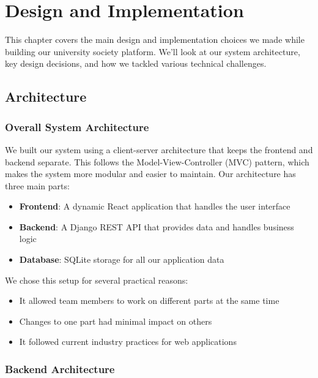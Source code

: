 \chapter{Design and Implementation}
\label{chap:design-and-implementation}

This chapter covers the main design and implementation choices we made while building our university society platform. We'll look at our system architecture, key design decisions, and how we tackled various technical challenges.

\section{Architecture}

\subsection{Overall System Architecture}

We built our system using a client-server architecture that keeps the frontend and backend separate. This follows the Model-View-Controller (MVC) pattern, which makes the system more modular and easier to maintain. Our architecture has three main parts:

\begin{itemize}
    \item \textbf{Frontend}: A dynamic React application that handles the user interface
    \item \textbf{Backend}: A Django REST API that provides data and handles business logic
    \item \textbf{Database}: SQLite storage for all our application data
\end{itemize}

We chose this setup for several practical reasons:

\begin{itemize}
    \item It allowed team members to work on different parts at the same time
    \item Changes to one part had minimal impact on others
    \item It followed current industry practices for web applications
\end{itemize}

\subsection{Backend Architecture}


